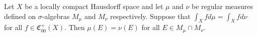 Let $X$ be a locally compact Hausdorff space and let $\mu$ and $\nu$ be regular measures defined on $\sigma$-algebras $M_\mu$ and $M_\nu$ respectively. Suppose that $\int_X f d\mu = \int_X f d\nu$ for all $f \in \mathfrak{C}_{00}^+(X)$. Then $\mu(E) = \nu(E)$ for all $E \in M_\mu \cap M_\nu$.